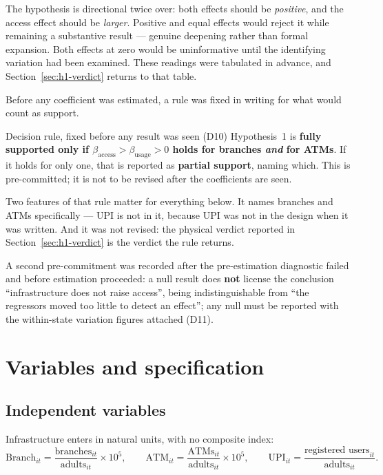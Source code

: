 \noindent
The hypothesis is directional twice over: both effects should be \emph{positive}, and the access
effect should be \emph{larger}. Positive and equal effects would reject it while remaining a
substantive result --- genuine deepening rather than formal expansion. Both effects at zero would
be uninformative until the identifying variation had been examined. These readings were tabulated
in advance, and Section~\ref{sec:h1-verdict} returns to that table.

Before any coefficient was estimated, a rule was fixed in writing for what would count as support.

\begin{keybox}{Decision rule, fixed before any result was seen (D10)}
Hypothesis~1 is \textbf{fully supported only if
$\beta_{\text{access}} > \beta_{\text{usage}} > 0$ holds for branches \emph{and} for ATMs}. If it
holds for only one, that is reported as \textbf{partial support}, naming which. This is
pre-committed; it is not to be revised after the coefficients are seen.
\end{keybox}

\noindent
Two features of that rule matter for everything below. It names branches and ATMs specifically ---
UPI is not in it, because UPI was not in the design when it was written. And it was not revised:
the physical verdict reported in Section~\ref{sec:h1-verdict} is the verdict the rule returns.

A second pre-commitment was recorded after the pre-estimation diagnostic failed and before
estimation proceeded: a null result does \textbf{not} license the conclusion ``infrastructure does
not raise access'', being indistinguishable from ``the regressors moved too little to detect an
effect''; any null must be reported with the within-state variation figures attached (D11).

\section{Variables and specification}
\label{sec:h1-variables}

\subsection{Independent variables}

Infrastructure enters in natural units, with no composite index:
\[
\text{Branch}_{it} = \frac{\text{branches}_{it}}{\text{adults}_{it}}\times 10^5,
\qquad
\text{ATM}_{it} = \frac{\text{ATMs}_{it}}{\text{adults}_{it}}\times 10^5,
\qquad
\text{UPI}_{it} = \frac{\text{registered users}_{it}}{\text{adults}_{it}}.
\]

